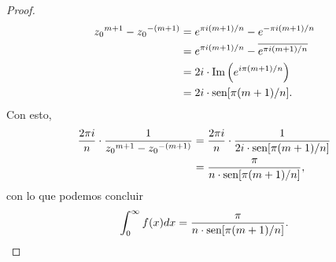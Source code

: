 \begin{proof}
$$\begin{aligned}
      {z_0}^{m+1}-{z_0}^{-(m+1)}&=e^{\pi i(m+1)/n}-e^{-\pi i(m+1)/n}\\
                                &=e^{\pi i(m+1)/n}-\overline{e^{\pi i(m+1)/n}}\\
                                &=2i\cdot\text{Im}\left( e^{i\pi (m+1)/n}\right)\\
                                &=2i\cdot\normalfont{\text{sen}}[\pi(m+1)/n].
   \end{aligned}
   $$
   Con esto,
   $$
   \begin{aligned}
      \frac{2\pi i}{n}\cdot\frac{1}{{z_0}^{m+1}-{z_0}^{-(m+1)}}&=\frac{2\pi i}{n}\cdot\frac{1}{2i\cdot\normalfont{\text{sen}}[\pi(m+1)/n]}\\
                                                               &=\frac{\pi}{n\cdot\normalfont{\text{sen}}[\pi(m+1)/n]},
   \end{aligned}
   $$
   con lo que podemos concluir
   $$
   \int_{0}^{\infty}f(x)dx=\frac{\pi}{n\cdot\normalfont{\text{sen}}[\pi(m+1)/n]}.
   $$
\end{proof}
